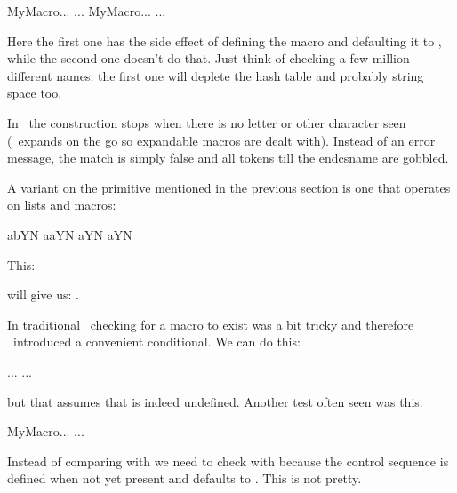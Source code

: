 \starttyping
\expandafter\ifx\csname MyMacro\endcsname\relax ... \else ... \fi
            \ifcsname   MyMacro\endcsname       ... \else ... \fi
\stoptyping

Here the first one has the side effect of defining the macro and defaulting it to
, while the second one doesn't do that. Just think of checking a
few million different names: the first one will deplete the hash table and
probably string space too.

In \LUAMETATEX\ the construction stops when there is no letter or other character
seen (\TEX\ expands on the go so expandable macros are dealt with). Instead of an
error message, the match is simply false and all tokens till the \prm
{endcsname} are gobbled.

\stopoldprimitive

\startnewprimitive[title={\prm {ifcstok}}]

A variant on the primitive mentioned in the previous section is one that
operates on lists and macros:

\startbuffer[a]
 \def\b{b} \def\c{a}
\stopbuffer

\typebuffer[a]

\startbuffer[b]
\ifcstok\a\b   Y\else N\fi\space
\ifcstok\a\c   Y\else N\fi\space
\ifcstok{\a}\c Y\else N\fi\space
{}\c  Y\else N\fi
\stopbuffer

This:

\typebuffer[b]

{\getbuffer[a]will give us: \inlinebuffer[b].}

\stopnewprimitive

\startoldprimitive[title={\prm {ifdefined}}]

In traditional \TEX\ checking for a macro to exist was a bit tricky and therefore
\ETEX\ introduced a convenient conditional. We can do this:

\starttyping
\ifx\MyMacro\undefined ... \else ... \fi
\stoptyping

but that assumes that \type {\undefined} is indeed undefined. Another test often
seen was this:

\starttyping
\expandafter\ifx\csname MyMacro\endcsname\relax ... \else ... \fi
\stoptyping

Instead of comparing with \type {\undefined} we need to check with 
because the control sequence is defined when not yet present and defaults to
. This is not pretty.

\stopoldprimitive

